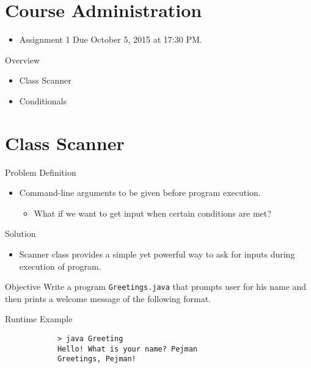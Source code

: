 \documentclass[10pt, compress]{beamer}
\begin{document}
\prepareCover

\section{Course Administration}

\begin{slide}
	\begin{itemize}
		\item[] Assignment 1 Due October 5, 2015 at 17:30 PM.
	\end{itemize}
\end{slide}

\begin{slide}
	\begin{block}{Overview}
		\begin{itemize}
			\item[] Class Scanner
			\item[] Conditionals
		\end{itemize}
	\end{block}
\end{slide}

\section{Class Scanner}

\begin{slide}
	\begin{block}{Problem Definition}
		\begin{itemize}
			\item[] Command-line arguments to be given before program execution.
			\begin{itemize}
				\item[] What if we want to get input when certain conditions are met?
			\end{itemize}
		\end{itemize}
	\end{block}
	\begin{block}{Solution}
		\begin{itemize}
			\item[] Scanner class provides a simple yet powerful way to ask for inputs during execution of program.
		\end{itemize}
	\end{block}
\end{slide}

\begin{slide}
	\begin{block}{Objective}
		Write a program \texttt{Greetings.java} that prompts user for his name and then prints a welcome message of the following format.
	\end{block}
	\begin{block}{Runtime Example}
		\begin{verbatim}
			> java Greeting
			Hello! What is your name? Pejman
			Greetings, Pejman!
		\end{verbatim}
	\end{block}
\end{slide}
\end{document}
